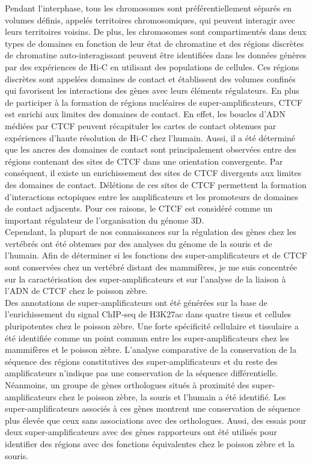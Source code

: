 		Pendant l'interphase, tous les chromosomes sont pr\'ef\'erentiellement s\'epar\'es en volumes d\'efinis, appel\'es territoires chromosomiques, qui peuvent interagir avec leurs territoires voisins. De plus, les chromosomes sont compartiment\'es dans deux types de domaines en fonction de leur \'etat de chromatine et des r\'egions discr\`etes de chromatine auto-interagissant peuvent \^etre identifi\'ees dans les donn\'ees g\'en\`eres par des exp\'eriences de Hi-C en utilisant des populations de cellules. Ces r\'egions discr\`etes sont appel\'ees domaines de contact et \'etablissent des volumes confin\'es qui favorisent les interactions des g\`enes avec leurs \'el\'ements r\'egulateurs. En plus de participer \`a la formation de r\'egions nucl\'eaires de super-amplificateurs, CTCF est enrichi aux limites des domaines de contact. En effet, les boucles d'ADN m\'edi\'ees par CTCF peuvent r\'ecapituler les cartes de contact obtenues par exp\'eriences d'haute r\'esolution de Hi-C chez l'humain. Aussi, il a \'et\'e d\'etermin\'e que les ancres des domaines de contact sont principalement observ\'ees entre des r\'egions contenant des sites de CTCF dans une orientation convergente. Par cons\'equent, il existe un enrichissement des sites de CTCF divergents aux limites des domaines de contact. D\'el\'etions de ces sites de CTCF permettent la formation d'interactions ectopiques entre les amplificateurs et les promoteurs de domaines de contact adjacents. Pour ces raisons, le CTCF est consid\'er\'e comme un important r\'egulateur de l'organisation du g\'enome 3D.\\

		Cependant, la plupart de nos connaissances sur la r\'egulation des g\`enes chez les vert\'ebr\'es ont \'et\'e obtenues par des analyses du g\'enome de la souris et de l'humain. Afin de d\'eterminer si les fonctions des super-amplificateurs et de CTCF sont conserv\'ees chez un vert\'ebr\'e distant des mammif\`eres, je me suis concentr\'ee sur la caract\'erisation des super-amplificateurs et sur l'analyse de la liaison \`a l'ADN de CTCF chez le poisson z\`ebre.\\

		Des annotations de super-amplificateurs ont \'et\'e g\'en\'er\'ees sur la base de l'enrichissement du signal ChIP-seq de H3K27ac dans quatre tissus et cellules pluripotentes chez le poisson zèbre. Une forte sp\'ecificit\'e cellulaire et tissulaire a \'et\'e identifi\'ee comme un point commun entre les super-amplificateurs chez les mammifères et le poisson zèbre. L'analyse comparative de la conservation de la s\'equence des r\'egions constitutives des super-amplificateurs et du reste des amplificateurs n'indique pas une conservation de la s\'equence diff\'erentielle. N\'eanmoins, un groupe de gènes orthologues situ\'es à proximit\'e des super-amplificateurs chez le poisson zèbre, la souris et l'humain a \'et\'e identifi\'e. Les super-amplificateurs associ\'es à ces gènes montrent une conservation de s\'equence plus \'elev\'ee que ceux sans associations avec des orthologues. Aussi, des essais pour deux super-amplificateurs avec des gènes rapporteurs ont \'et\'e utilis\'es pour identifier des r\'egions avec des fonctions \'equivalentes chez le poisson zèbre et la souris.\\

